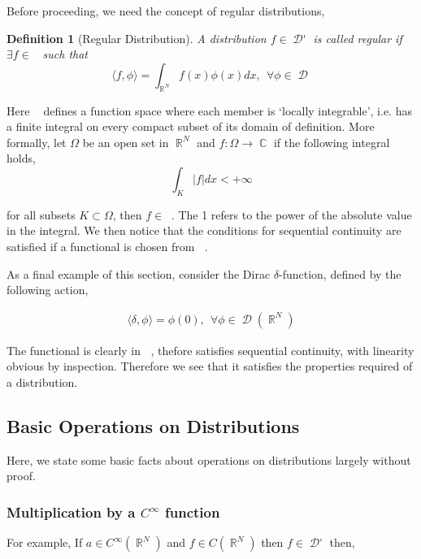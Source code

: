\documentclass[12pt, a4]{article}
\newtheorem{definition}{Definition}[section]
\DeclareMathOperator\reals{\mathbb{R}}
\DeclareMathOperator\complexes{\mathbb{C}}
\DeclareMathOperator\tfspaceD{\mathcal{D}}
\DeclareMathOperator\dist{\mathcal{D'}}
\DeclareMathOperator\lone{L_{\text{loc}}^1}
\begin{document}
Before proceeding, we need the concept of regular distributions,

\begin{definition}[Regular Distribution]
A distribution $f \in \dist$ is called regular if $\exists f \in \lone$ such that \[ \langle f, \phi \rangle = \int_{\reals^N} f(x) \phi(x) dx, \> \> \forall \phi \in \tfspaceD\]
    \label{def:regular_dist}
\end{definition}

Here $\lone$ defines a function space where each member is `locally integrable', i.e. has a finite integral on every compact subset of its domain of definition. More formally, let $\Omega$ be an open set in $\reals^N$ and $f : \Omega \rightarrow \complexes$ if the following integral holds,
\begin{equation}
    \int_K |f| dx < + \infty
    \label{eq:l_one_loc}
\end{equation}

for all subsets $K \subset \Omega$, then $f \in \lone$. The 1 refers to the power of the absolute value in the integral. We then notice that the conditions for sequential continuity are satisfied if a functional is chosen from $\lone$.

\vspace{5pt}

As a final example of this section, consider the Dirac $\delta$-function, defined by the following action,

\begin{eqnarray}
\langle \delta, \phi \rangle = \phi(0), \> \> \forall \phi \in \tfspaceD(\reals^N)
    \label{eq:dirac}
\end{eqnarray}

The functional is clearly in $\lone$, thefore satisfies sequential continuity, with linearity obvious by inspection. Therefore we see that it satisfies the properties required of a distribution.

\subsection{Basic Operations on Distributions}

Here, we state some basic facts about operations on distributions largely without proof.

\subsubsection{Multiplication by a $C^\infty$ function}
For example, If $a \in C^\infty(\reals^N)$ and $f \in C(\reals^N)$ then $f \in \dist$ then,
\end{document}

